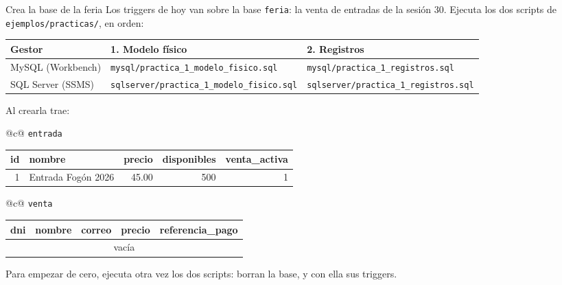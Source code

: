\documentclass[aspectratio=169,10pt,c]{beamer}
\makeatletter
\newcommand{\tbl}[1]{\textcolor{utpNaranja}{\texttt{#1}}}
\newcommand{\gris}[1]{\textcolor{utpGris}{#1}}
\newcommand{\ins}[1]{\tikz[baseline=-0.5ex]{\node[rounded corners=2pt,fill=utpRojo,text=white,
  font=\bfseries\scriptsize,inner xsep=5pt,inner ysep=2.5pt] {#1};}}
\newcommand{\cab}[1]{\normalfont\bfseries #1}
\newcommand{\mini}[4]{%
  \begin{tabular}{@{}c@{}}
  \tbl{#1}\\[3pt]
  {\scriptsize\ttfamily
  \begin{tabular}{#2}
  \toprule
  #3 \\
  \midrule
  #4
  \bottomrule
  \end{tabular}}
  \end{tabular}}
\makeatother
\begin{document}
\begin{frame}{\ins{Práctica 1} Crea la base de la feria}
\small Los triggers de hoy van sobre la base \texttt{feria}: la venta de entradas de la sesión 30. Ejecuta los dos scripts de \texttt{ejemplos/practicas/}, en orden:
\vspace{0.2cm}
\begin{center}
\scriptsize
\renewcommand{\arraystretch}{1.3}
\begin{tabular}{@{}lll@{}}
\toprule
\bfseries Gestor & \bfseries 1. Modelo físico & \bfseries 2. Registros \\
\midrule
MySQL (Workbench) & \texttt{mysql/practica\_1\_modelo\_fisico.sql} & \texttt{mysql/practica\_1\_registros.sql} \\
SQL Server (SSMS) & \texttt{sqlserver/practica\_1\_modelo\_fisico.sql} & \texttt{sqlserver/practica\_1\_registros.sql} \\
\bottomrule
\end{tabular}
\end{center}
\small Al crearla trae:
\vspace{0.05cm}
\begin{center}
\mini{entrada}{rlrrr}{\cab{id} & \cab{nombre} & \cab{precio} & \cab{disponibles} & \cab{venta\_activa}}{1 & Entrada Fogón 2026 & 45.00 & 500 & 1 \\}
\hspace{0.2cm}
\mini{venta}{lllll}{\cab{dni} & \cab{nombre} & \cab{correo} & \cab{precio} & \cab{referencia\_pago}}{\multicolumn{5}{c}{\normalfont\gris{vacía}} \\}
\end{center}
\vspace{-0.1cm}
{\centering\footnotesize\gris{Para empezar de cero, ejecuta otra vez los dos scripts: borran la base, y con ella sus triggers.}\par}
\end{frame}
\end{document}
